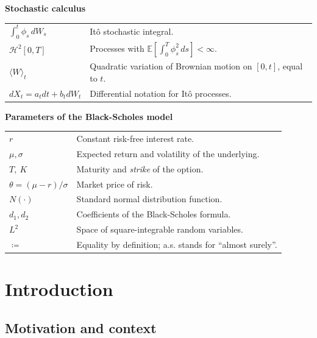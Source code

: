 \documentclass[11pt,a4paper,oneside]{report}
\theoremstyle{plain}
\theoremstyle{definition}
\theoremstyle{remark}
\newcommand{\E}{\mathbb{E}}
\newcommand{\HH}{\mathcal{H}}
\newcommand{\1}{\mathbf{1}}
\newcommand{\eqdef}{\coloneqq}
\begin{document}
\vspace{0.2cm}

\noindent\textbf{Stochastic calculus}
\begin{center}
\begin{tabular}{@{}p{4cm}p{10cm}@{}}
$\int_0^t \phi_s\, dW_s$ & Itô stochastic integral. \\
$\HH^2[0, T]$ & Processes with $\E[\int_0^T \phi_s^2\, ds] < \infty$. \\
$\langle W\rangle_t$ & Quadratic variation of Brownian motion on $[0, t]$, equal to $t$. \\
$dX_t = a_t dt + b_t dW_t$ & Differential notation for Itô processes. \\
\end{tabular}
\end{center}

\newpage

\noindent\textbf{Parameters of the Black-Scholes model}
\begin{center}
\begin{tabular}{@{}p{4cm}p{10cm}@{}}
$r$ & Constant risk-free interest rate. \\
$\mu, \sigma$ & Expected return and volatility of the underlying. \\
$T,\ K$ & Maturity and \emph{strike} of the option. \\
$\theta = (\mu - r)/\sigma$ & Market price of risk. \\
$N(\cdot)$ & Standard normal distribution function. \\
$d_1, d_2$ & Coefficients of the Black-Scholes formula. \\
$L^2$ & Space of square-integrable random variables. \\
$\eqdef$ & Equality by definition; a.s. stands for ``almost surely''. \\
\end{tabular}
\end{center}

\setcounter{page}{1}
\chapter{Introduction}\label{cap:intro}

\section{Motivation and context}
\label{sec:motivacion}
\end{document}
